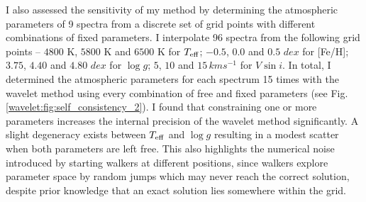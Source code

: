 I also assessed the sensitivity of my method by determining the atmospheric parameters of 9 spectra from a discrete set of grid points with different combinations of fixed parameters. I interpolate 96 spectra from the following grid points -- $4800$ K, $5800$ K and $6500$ K for $T_{\rm eff}$; $-0.5$, $0.0$ and $0.5$ $dex$ for [Fe/H]; $3.75$, $4.40$ and $4.80$ $dex$ for $\log g$; $5$, $10$ and $15\,kms^{-1}$ for $V \sin i$. In total, I determined the atmospheric parameters  for each spectrum 15 times with the wavelet method using every combination of free and fixed parameters (see Fig. \ref{wavelet:fig:self_consistency_2}). I found that constraining one or more parameters increases the internal precision of the wavelet method significantly. A slight degeneracy exists between $T_{\rm eff}$ and $\log g$ resulting in a modest scatter when both parameters are left free. This also highlights the numerical noise introduced by starting walkers at different positions, since walkers explore parameter space by random jumps which may never reach the correct solution, despite prior knowledge that an exact solution lies somewhere within the grid. 

